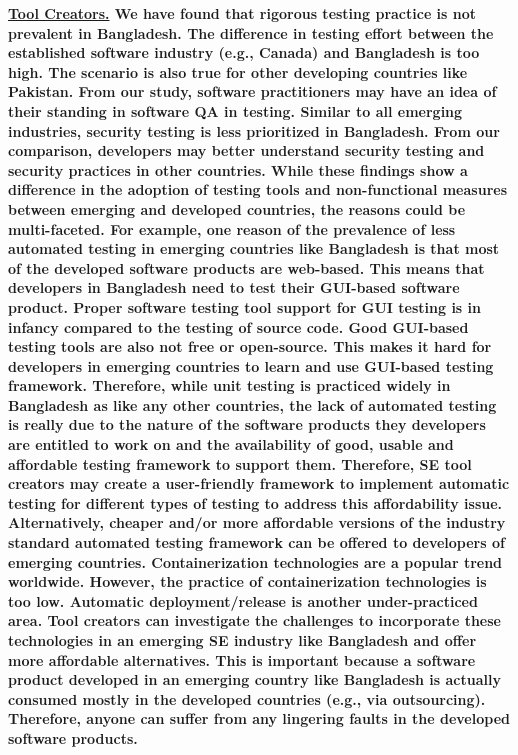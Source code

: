 \bf{\ul{Tool Creators.}} We have found that rigorous testing practice
is not prevalent in Bangladesh. The difference in testing effort between the
established software industry (e.g., Canada) and Bangladesh is too high. The
scenario is also true for other developing countries like Pakistan. From our
study, software practitioners may have an idea of their standing in software QA
in testing. Similar to all emerging industries, security testing is less
prioritized in Bangladesh. From our comparison, developers may better understand
security testing and security practices in other countries. While these findings show a 
difference in the adoption of testing tools and non-functional measures 
between emerging and developed countries, the reasons could be multi-faceted. 
For example, one reason of the prevalence of less automated testing in emerging countries 
like Bangladesh is that most of the developed software products are web-based. This means 
that developers in Bangladesh need to test their GUI-based software product. 
Proper software testing tool support for GUI testing is in infancy compared to 
the testing of source code. Good GUI-based testing tools are also not 
free or open-source. This makes it hard for developers in emerging countries to 
learn and use GUI-based testing framework. Therefore, 
while unit testing is practiced widely in Bangladesh as like any other countries, 
the lack of automated testing is really due to the nature of the software products 
they developers are entitled to work on and the availability of good, usable and affordable 
testing framework to support them. Therefore, SE tool creators may create a
user-friendly framework to implement automatic testing for different types of
testing to address this affordability issue. Alternatively, 
cheaper and/or more affordable versions of the industry standard automated testing framework 
can be offered to developers of emerging countries. Containerization technologies are a popular trend worldwide. However, the
practice of containerization technologies is too low. Automatic
deployment/release is another under-practiced area. Tool creators can investigate
the challenges to incorporate these technologies in an emerging SE industry like
Bangladesh and offer more affordable alternatives. This is important because a software 
product developed in an emerging country like Bangladesh is actually consumed mostly in the developed 
countries (e.g., via outsourcing). Therefore, anyone can suffer from any lingering faults in the developed software products.

